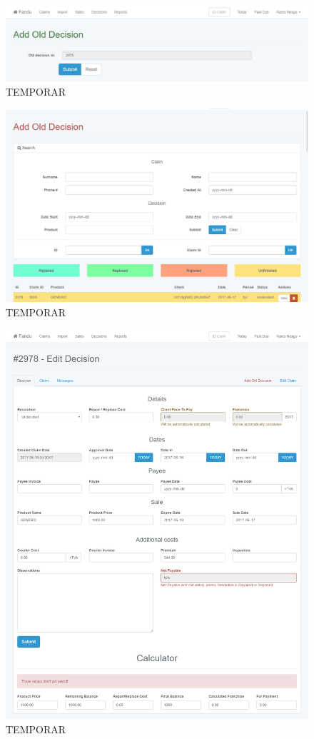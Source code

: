 	\begin{figure}
		\includegraphics[width=\linewidth]{../imagini/decisions_add_conirm.png}
		\caption{TEMPORAR}
		\label{fig:TEMP}
	\end{figure}
	\begin{figure}
		\includegraphics[width=\linewidth]{../imagini/decisions_add_old.png}
		\caption{TEMPORAR}
		\label{fig:TEMP}
	\end{figure}
	\begin{figure}
		\includegraphics[width=\linewidth]{../imagini/decisions_edit.png}
		\caption{TEMPORAR}
		\label{fig:TEMP}
	\end{figure}
